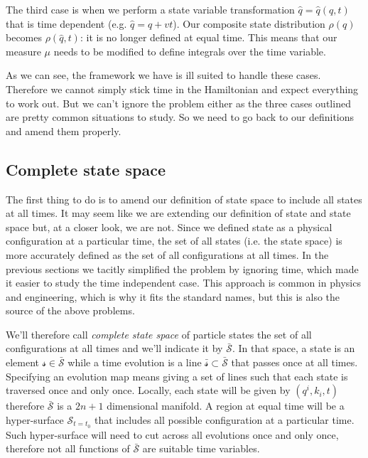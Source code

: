 \documentclass[aps,pra,10pt,twocolumn,floatfix,nofootinbib]{revtex4-1}
\numberwithin{equation}{section}
\theoremstyle{definition}
\begin{document}
The third case is when we perform a state variable transformation $\hat{q}=\hat{q}(q,t)$ that is time dependent (e.g. $\hat{q}=q+vt$). Our composite state distribution $\rho(q)$ becomes $\rho(\hat{q},t)$: it is no longer defined at equal time. This means that our measure $\mu$ needs to be modified to define integrals over the time variable.

As we can see, the framework we have is ill suited to handle these cases. Therefore we cannot simply stick time in the Hamiltonian and expect everything to work out. But we can't ignore the problem either as the three cases outlined are pretty common situations to study. So we need to go back to our definitions and amend them properly.

\subsection{Complete state space}

The first thing to do is to amend our definition of state space to include all states at all times. It may seem like we are extending our definition of state and state space but, at a closer look, we are not. Since we defined state as a physical configuration at a particular time, the set of all states (i.e. the state space) is more accurately defined as the set of all configurations at all times. In the previous sections we tacitly simplified the problem by ignoring time, which made it easier to study the time independent case. This approach is common in physics and engineering, which is why it fits the standard names, but this is also the source of the above problems.

We'll therefore call \emph{complete state space} of particle states the set of all configurations at all times and we'll indicate it by $\bar{\mathcal{S}}$. In that space, a state is an element $\mathcal{s} \in \bar{\mathcal{S}}$ while a time evolution is a line $\bar{\mathcal{s}} \subset \bar{\mathcal{S}}$ that passes once at all times. Specifying an evolution map means giving a set of lines such that each state is traversed once and only once. Locally, each state will be given by $(q^i, k_i, t)$ therefore $\bar{\mathcal{S}}$ is a $2n+1$ dimensional manifold. A region at equal time will be a hyper-surface $\mathcal{S}_{t=t_0}$ that includes all possible configuration at a particular time. Such hyper-surface will need to cut across all evolutions once and only once, therefore not all functions of $\bar{\mathcal{S}}$ are suitable time variables.
\end{document}
